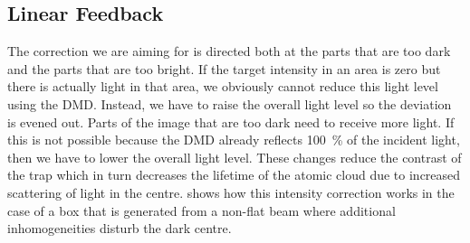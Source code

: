 \subsection{Linear Feedback}
The correction we are aiming for is directed both at the parts that are too dark and the parts that are too bright. If the target intensity in an area is zero but there is actually light in that area, we obviously cannot reduce this light level using the DMD. Instead, we have to raise the overall light level so the deviation is evened out. Parts of the image that are too dark need to receive more light. If this is not possible because the DMD already reflects \SI{100}{\percent} of the incident light, then we have to lower the overall light level. These changes reduce the contrast of the trap which in turn decreases the lifetime of the atomic cloud due to increased scattering of light in the centre.  shows how this intensity correction works in the case of a box that is generated from a non-flat beam where additional inhomogeneities disturb the dark centre.

